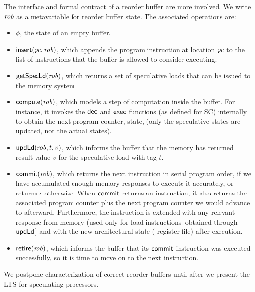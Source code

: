 The interface and formal contract of a reorder buffer are more
involved.  We write $\mathit{rob}$ as a metavariable for reorder buffer
state.  The associated operations are:
\begin{itemize}
\item $\phi$, the state of an empty buffer.
\item $\mathsf{insert}(\mathit{pc}, \mathit{rob})$, which appends the program instruction at location $\mathit{pc}$ to the list of instructions that the buffer is allowed to consider executing.
\item $\mathsf{get}\mathsf{Spec}\mathsf{Ld}(\mathit{rob})$, which returns a set of speculative loads that can be issued to the memory system
\item $\mathsf{compute}(\mathit{rob})$, which models a
step of computation inside the buffer. For instance, it invokes the $\mathsf{dec}$
and $\mathsf{exec}$ functions (as defined for SC) internally to obtain the next program
counter, state, \etc{} (only the speculative states are updated, not the actual states).
\item $\mathsf{upd}\mathsf{Ld}(\mathit{rob},t,v)$, which informs the buffer that the memory
has returned result value $v$ for the speculative load with tag $t$.
\item $\mathsf{commit}(\mathit{rob})$, which returns the next instruction in serial
program order, if we have accumulated enough memory responses to execute it
accurately, or returns
$\epsilon$ otherwise.  When $\mathsf{commit}$ returns an instruction, it also
returns the associated program counter plus the next program counter
we would advance to afterward.
 Furthermore, the instruction is
extended with any relevant response from memory (used only for load
instructions, obtained through $\mathsf{upd}\mathsf{Ld}$) and with the new architectural state (\eg{} register
file) after execution.
\item $\mathsf{retire}(\mathit{rob})$, which informs the buffer that its $\mathsf{commit}$
instruction was executed successfully, so it is time to move on to the
next instruction.
\end{itemize}

We postpone characterization of correct reorder buffers until after we
present the LTS for speculating processors.

